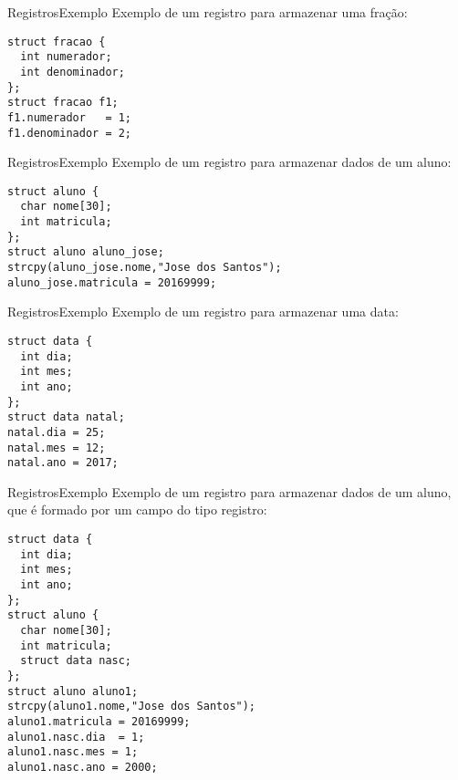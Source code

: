 \documentclass[aspectratio=169]{beamer}
\begin{document}

\begin{frame}[fragile]{Registros}{Exemplo}
Exemplo de um registro para armazenar uma fração:
\begin{lstlisting}
struct fracao {
  int numerador;
  int denominador;
};
struct fracao f1;
f1.numerador   = 1;
f1.denominador = 2;
\end{lstlisting} 
\end{frame}


\begin{frame}[fragile]{Registros}{Exemplo}
Exemplo de um registro para armazenar dados de um aluno:
\begin{lstlisting}
struct aluno {
  char nome[30];
  int matricula;
};
struct aluno aluno_jose;
strcpy(aluno_jose.nome,"Jose dos Santos");
aluno_jose.matricula = 20169999; 
\end{lstlisting} 
\end{frame}


\begin{frame}[fragile]{Registros}{Exemplo}
Exemplo de um registro para armazenar uma data:
\begin{lstlisting}
struct data {
  int dia;
  int mes;
  int ano;
};
struct data natal;
natal.dia = 25;
natal.mes = 12;
natal.ano = 2017;
\end{lstlisting} 
\end{frame}


\begin{frame}[fragile]{Registros}{Exemplo}
Exemplo de um registro para armazenar dados de um aluno, que é formado por um campo do tipo registro:
\begin{lstlisting}
struct data {
  int dia;
  int mes;
  int ano;
};
struct aluno {
  char nome[30];
  int matricula;
  struct data nasc;
};
struct aluno aluno1;
strcpy(aluno1.nome,"Jose dos Santos");
aluno1.matricula = 20169999; 
aluno1.nasc.dia  = 1;
aluno1.nasc.mes = 1;
aluno1.nasc.ano = 2000;
\end{lstlisting} 
\end{frame}
\end{document}
